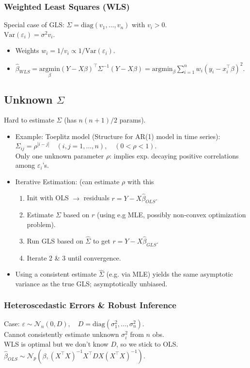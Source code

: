 \subsubsection*{Weighted Least Squares (WLS)}
Special case of GLS: $\Sigma = \text{diag}(v_1, \dots, v_n)$ with $v_i > 0$.
\\ $\text{Var}(\varepsilon_i) = \sigma^2 v_i$.
\begin{itemize}
    \item Weights $w_i = 1/v_i \propto 1/\text{Var}(\varepsilon_i)$.
    \item $\hat{\beta}_{WLS} = \underset{\beta}{\text{argmin}} (Y - X\beta)^\top \Sigma^{-1} (Y - X\beta) = \text{argmin}_\beta \sum_{i=1}^n w_i (y_i - x_i^\top \beta)^2$.
\end{itemize}

\subsection*{Unknown $\Sigma$}
Hard to estimate $\Sigma$ (has $n(n+1)/2$ params).
\begin{itemize}
    \item Example: Toeplitz model (Structure for AR(1) model in time series): \\
    $\Sigma_{ij} = \rho^{|i-j|} \quad (i,j=1,\dots,n), \quad (0 < \rho < 1)$. \\
    Only one unknown parameter $\rho$: implies exp. decaying positive correlations among $\varepsilon_i$'s.
    \item Iterative Estimation: (can estimate $\rho$ with this
    \begin{enumerate}
        \item Init with OLS $\to$ residuals $r = Y - X\hat{\beta}_{OLS}$.
        \item Estimate $\Sigma$ based on $r$ (using e.g MLE, possibly non-convex optimization problem).
        \item Run GLS based on $\hat{\Sigma}$ to get $r = Y - X\hat{\beta}_{GLS}$.
        \item Iterate 2 \& 3 until convergence.

    \end{enumerate}
    \item Using a consistent estimate $\hat{\Sigma}$ (e.g. via MLE) yields the same asymptotic variance as the true GLS; asymptotically unbiased.
\end{itemize}

\subsubsection{Heteroscedastic Errors \& Robust Inference}
Case: $\varepsilon \sim \mathcal{N}_n(0, D), \quad D = \text{diag}(\sigma_1^2, \dots, \sigma_n^2)$.
\\ Cannot consistently estimate unknown $\sigma_i^2$ from $n$ obs.
\\ WLS is optimal but we don't know $D$, so we stick to OLS.
\\ $\hat{\beta}_{OLS} \sim \mathcal{N}_p(\beta, (X^\top X)^{-1} X^\top D X (X^\top X)^{-1})$.


